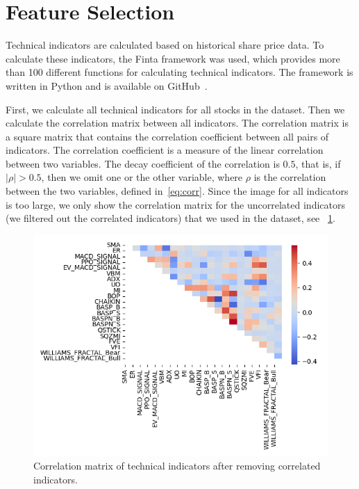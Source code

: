 \documentclass[../xlapes02]{subfiles}
\begin{document}
    \section{Feature Selection}\label{sec:feature-selection}
    Technical indicators are calculated based on historical share price data. To calculate these indicators, the Finta framework was used, which provides more than 100 different functions for calculating technical indicators. The framework is written in Python and is available on GitHub~\cite{finta}.

    First, we calculate all technical indicators for all stocks in the dataset. Then we calculate the correlation matrix between all indicators. The correlation matrix is a square matrix that contains the correlation coefficient between all pairs of indicators. The correlation coefficient is a measure of the linear correlation between two variables. The decay coefficient of the correlation is $0.5$, that is, if $|\rho| > 0.5$, then we omit one or the other variable, where $\rho$ is the correlation between the two variables, defined in~\cref{eq:corr}. Since the image for all indicators is too large, we only show the correlation matrix for the uncorrelated indicators (we filtered out the correlated indicators) that we used in the dataset, see ~\cref{fig:ta_correlation_matrix_uncorrelated_indicators}.
    \begin{figure}[h]
        \includegraphics[width=0.95\linewidth]{image/ta_correlation_matrix_uncorrelated_indicators}
        \centering
        \caption{Correlation matrix of technical indicators after removing correlated indicators.}
        \label{fig:ta_correlation_matrix_uncorrelated_indicators}
    \end{figure}
\end{document}
